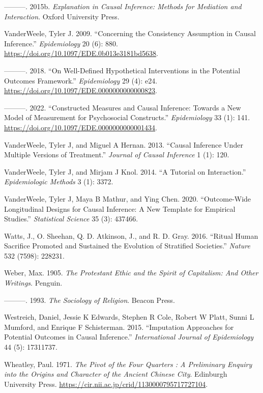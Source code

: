 \documentclass[
  singlecolumn]{report}
\newlength{\cslhangindent}
\newlength{\cslentryspacingunit} %
\newenvironment{CSLReferences}[2] %
 {%
  \setlength{\parindent}{0pt}
  \ifodd #1
  \let\oldpar\par
  \def\par{\hangindent=\cslhangindent\oldpar}
  \fi
  \setlength{\parskip}{#2\cslentryspacingunit}
 }%
 {}
\begin{document}
\begin{CSLReferences}{1}{0}
\leavevmode{}%
---------. 2015b. \emph{Explanation in Causal Inference: Methods for
Mediation and Interaction}. Oxford University Press.

\leavevmode{}%
VanderWeele, Tyler J. 2009. {``Concerning the Consistency Assumption in
Causal Inference.''} \emph{Epidemiology} 20 (6): 880.
\url{https://doi.org/10.1097/EDE.0b013e3181bd5638}.

\leavevmode{}%
---------. 2018. {``On Well-Defined Hypothetical Interventions in the
Potential Outcomes Framework.''} \emph{Epidemiology} 29 (4): e24.
\url{https://doi.org/10.1097/EDE.0000000000000823}.

\leavevmode{}%
---------. 2022. {``Constructed Measures and Causal Inference: Towards a
New Model of Measurement for Psychosocial Constructs.''}
\emph{Epidemiology} 33 (1): 141.
\url{https://doi.org/10.1097/EDE.0000000000001434}.

\leavevmode{}%
VanderWeele, Tyler J, and Miguel A Hernan. 2013. {``Causal Inference
Under Multiple Versions of Treatment.''} \emph{Journal of Causal
Inference} 1 (1): 120.

\leavevmode{}%
VanderWeele, Tyler J, and Mirjam J Knol. 2014. {``A Tutorial on
Interaction.''} \emph{Epidemiologic Methods} 3 (1): 3372.

\leavevmode{}%
VanderWeele, Tyler J, Maya B Mathur, and Ying Chen. 2020.
{``Outcome-Wide Longitudinal Designs for Causal Inference: A New
Template for Empirical Studies.''} \emph{Statistical Science} 35 (3):
437466.

\leavevmode{}%
Watts, J., O. Sheehan, Q. D. Atkinson, J., and R. D. Gray. 2016.
{``Ritual Human Sacrifice Promoted and Sustained the Evolution of
Stratified Societies.''} \emph{Nature} 532 (7598): 228231.

\leavevmode{}%
Weber, Max. 1905. \emph{The Protestant Ethic and the Spirit of
Capitalism: And Other Writings}. Penguin.

\leavevmode{}%
---------. 1993. \emph{The Sociology of Religion}. Beacon Press.

\leavevmode{}%
Westreich, Daniel, Jessie K Edwards, Stephen R Cole, Robert W Platt,
Sunni L Mumford, and Enrique F Schisterman. 2015. {``Imputation
Approaches for Potential Outcomes in Causal Inference.''}
\emph{International Journal of Epidemiology} 44 (5): 17311737.

\leavevmode{}%
Wheatley, Paul. 1971. \emph{The Pivot of the Four Quarters : A
Preliminary Enquiry into the Origins and Character of the Ancient
Chinese City}. Edinburgh University Press.
\url{https://cir.nii.ac.jp/crid/1130000795717727104}.

\end{CSLReferences}
\end{document}
